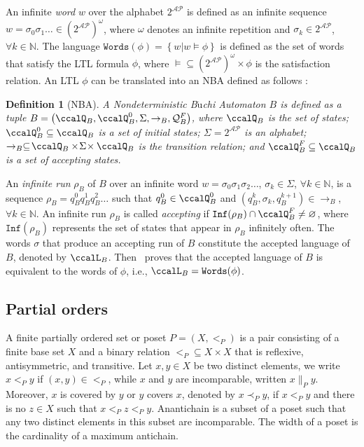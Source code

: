 \documentclass[journal]{IEEEtran}
\newtheorem{defn}[thm]{Definition}
\begin{document}
An infinite \textit{word} $w$ over the alphabet $2^{\mathcal{AP}}$ is defined as an infinite sequence  $w=\sigma_0\sigma_1\ldots\in (2^{\mathcal{AP}})^{\omega}$, where $\omega$ denotes an infinite repetition and $\sigma_k\in2^{\mathcal{AP}}$, $\forall k\in\mathbb{N}$. The language $\texttt{Words}(\phi)=\left\{w|w\models\phi\right\}$ is defined as the set of words that satisfy the LTL formula $\phi$, where $\models\subseteq (2^{\mathcal{AP}})^{\omega}\times\phi$ is the satisfaction relation. An LTL $\phi$ can be translated into an NBA  defined as follows \cite{vardi1986automata}:
\begin{defn}[NBA]\label{def:nba}
  A \textit{Nondeterministic B$\ddot{\text{u}}$chi Automaton} $B$ is defined as a tuple $B=\left(\ccalQ_{B}, \ccalQ_{B}^0,\Sigma,\rightarrow_B,\mathcal{Q}_B^F\right)$, where $\ccalQ_{B}$ is the set of states; $\ccalQ_{B}^0\subseteq\ccalQ_{B}$ is a set of initial states; $\Sigma=2^{\mathcal{AP}}$ is an alphabet;  $\rightarrow_{B}\subseteq\!\ccalQ_{B}\times \!\Sigma\!\times\ccalQ_{B}$ is the transition relation;
and $\ccalQ_B^F\subseteq\ccalQ_{B}$ is a set of accepting states.
\end{defn}

An \textit{infinite run} $\rho_B$ of $B$ over an infinite word $w=\sigma_0\sigma_1\sigma_2\dots$, $\sigma_k\in\Sigma$, $\forall k\in\mathbb{N}$, is a sequence $\rho_B=q_B^0q_B^1q_B^2\dots$ such that $q_B^0\in\ccalQ_B^0$ and $(q_B^{k},\sigma_k,q_B^{k+1})\in\rightarrow_{B}$, $\forall k\in\mathbb{N}$.
An infinite run $\rho_B$ is called \textit{accepting} if $\texttt{Inf}(\rho_B)\cap\ccalQ_B^F\neq\varnothing$, where $\texttt{Inf}(\rho_B)$ represents the set of states that appear in $\rho_B$ infinitely often. The words $\sigma$ that produce an accepting run of $B$ constitute the accepted language of $B$, denoted by $\ccalL_B$. Then~\cite{baier2008principles} proves that the accepted language of $B$ is equivalent to the words of $\phi$, i.e., $\ccalL_B=\texttt{Words}(\phi)$.

\subsection{Partial orders}\label{sec:partial}
A finite partially ordered set or poset $P\! =\! (X, <_P )$  is a pair consisting of a finite base set $X$ and a binary relation $<_P \subseteq \!\!X \!\times\! X$ that is reflexive, antisymmetric, and transitive. Let  $x, y \in X$ be two distinct elements, we write $x\! <_P\! y$ if $(x,y) \!\in <_P$, while $x$ and $y$ are incomparable, written $x \|_P y$. Moreover, $x$ is covered by $y$ or $y$ covers $x$, denoted by $x \!\prec_P \!y$, if $x\!<_P \! y$ and there is no $z \!\in \!X$ such that $x \! <_P \! z \!<_P \!y$. Anantichain is a subset of a poset such that any two distinct elements in this subset are incomparable. The width of a poset is the cardinality of a maximum antichain. %
\end{document}
